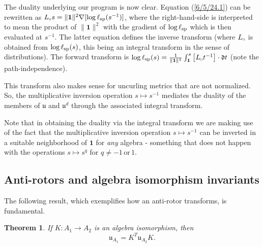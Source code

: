 \documentclass{amsart}
\numberwithin{equation}{section}
\newtheorem{theorem}{Theorem}
\theoremstyle{definition}
\numberwithin{theorem}{section}
\begin{document}
The duality underlying our program is now clear.  Equation (\ref{6/5/24.1}) can be rewritten as  $L_{\shortparallel}s = \|\mathbf{1}\|^2 \nabla[\log \ell_{\rm sp}(s^{-1})]$, where the right-hand-side is interpreted to mean the product of $\|\mathbf{1}\|^2$ with the gradient of $\log \ell_{\rm sp}$ which is then evaluated at $s^{-1}$.  The latter equation defines the inverse transform (where $L_{\shortparallel}$ is obtained from $\log\ell_{\rm sp}(s)$, this being an integral transform in the sense of distributions).  The forward transform is $\log\ell_{\rm sp}(s) = \frac{1}{\|\mathbf{1}\|^2}\int_{{\bf 1}}^{s} \left[L_{\shortparallel} t^{-1}\right]\cdot \mathfrak{d}t$ (note the path-independence).    

This transform also makes sense for uncurling metrics that are not normalized. So, the multiplicative inversion operation $s\mapsto s^{-1}$ mediates the duality of the members of $\mathfrak{u}$ and $\mathfrak{u}^d$ through the associated integral transform.

Note that in obtaining the duality via the integral transform we are making use of the fact that the multiplicative inversion operation $s\mapsto s^{-1}$ can be inverted in a suitable neighborhood of $\mathbf{1}$ for {\it any} algebra - something that does not happen with the operations $s\mapsto s^q$ for $q\ne -1\,\text{or}\, 1$.

\subsection{Anti-rotors and algebra isomorphism invariants} The following result, which exemplifies how an anti-rotor transforms, is fundamental.

\begin{theorem} \label{6/6/23.1} If $K:A_1\rightarrow A_2$ is an algebra isomorphism, then \begin{equation}\label{5/23/23.1} \mathfrak{u}_{A_1} = K^T \mathfrak{u}_{A_2} K. \end{equation} \end{theorem}
\end{document}
